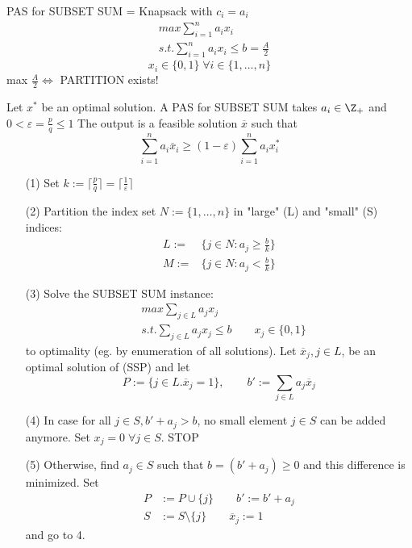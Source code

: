 \begin{xmp+}
PAS for SUBSET SUM = Knapsack with $c_i=a_i$
\begin{align*}
  &max \sum_{i=1}^n a_i x_i \\
  &s.t. \sum_{i=1}^n a_i x_i \leq b = \frac A 2
\end{align*}
\[
  x_i \in \{0,1\} \; \forall i  \in \{1,\dots,n\}
\]
max $\frac A 2 \Leftrightarrow$ PARTITION exists!

Let $x^*$ be an optimal solution. A PAS for SUBSET SUM takes $a_i \in \Z_+$ and $0 < \varepsilon=\frac pq \leq 1$
The output is a feasible solution $\overline x$ such that 
\[
  \sum_{i=1}^n a_i \overline x _i \geq (1- \varepsilon) \sum_{i=1}^n a_i x_i^*
\]
\begin{enumerate}
\item[(1)]Set $k:= \lceil \frac pq \rceil = \lceil \frac 1 \varepsilon \rceil$ 
\item[(2)]Partition the index set $N:=\{1,\dots,n\}$ in "large" (L) and "small" (S) indices:
  \begin{align*}
    L:=& \{j \in N: a_j \geq \frac b k\} \\
    M:=& \{j \in N: a_j < \frac bk\}
  \end{align*}
\item[(3)]Solve the SUBSET SUM instance:
   \begin{align*}
    &max \sum_{j \in L} a_j x_j \\
    & s.t. \sum_{j \in L} a_j x_j \leq b \qquad x_j \in \{0,1\}
  \end{align*}
  to optimality (eg. by enumeration of all solutions).
  Let $\overline x _j, j \in L$, be an optimal solution of (SSP) and let
  \[
    P:=\{j \in L. \overline x _j =1\}, \qquad b':=\sum_{j \in L} a_j \overline x_j
  \]
\item[(4)]In case for all $j \in S, b'+a_j > b$, no small element $j \in S$ can be added anymore. Set $x_j=0 \; \forall j \in S$. STOP \\
\item[(5)]Otherwise, find $a_j \in S$ such that $b=(b'+a_j) \geq 0$ and this difference is minimized. Set
  \begin{align*}
    P&:= P  \cup \{j\} \qquad b':=b'+a_j \\
    S&:= S\setminus \{j\} \qquad \overline x _j:=1 
  \end{align*}
  and go to 4.
\end{enumerate}
\end{xmp+}


